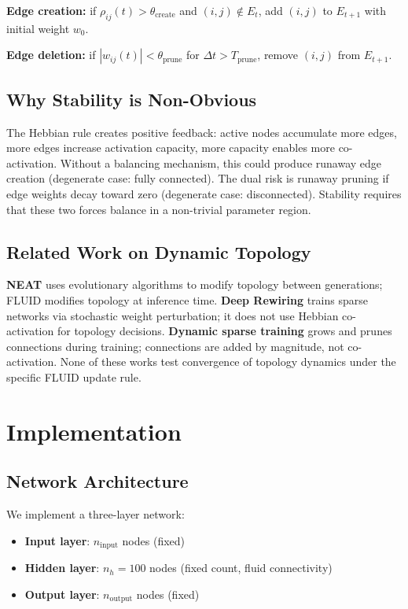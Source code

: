 \documentclass[12pt]{article}
\begin{document}
\textbf{Edge creation:} if $\rho_{ij}(t) > \theta_{\text{create}}$ and $(i,j) \notin E_t$, add $(i,j)$ to $E_{t+1}$ with initial weight $w_0$.

\textbf{Edge deletion:} if $|w_{ij}(t)| < \theta_{\text{prune}}$ for $\Delta t > T_{\text{prune}}$, remove $(i,j)$ from $E_{t+1}$.

\subsection{Why Stability is Non-Obvious}

The Hebbian rule creates positive feedback: active nodes accumulate more edges, more edges increase activation capacity, more capacity enables more co-activation. Without a balancing mechanism, this could produce runaway edge creation (degenerate case: fully connected). The dual risk is runaway pruning if edge weights decay toward zero (degenerate case: disconnected). Stability requires that these two forces balance in a non-trivial parameter region.

\subsection{Related Work on Dynamic Topology}

\textbf{NEAT} \cite{stanley2002} uses evolutionary algorithms to modify topology between generations; FLUID modifies topology at inference time. \textbf{Deep Rewiring} \cite{bellec2018} trains sparse networks via stochastic weight perturbation; it does not use Hebbian co-activation for topology decisions. \textbf{Dynamic sparse training} \cite{mocanu2018} grows and prunes connections during training; connections are added by magnitude, not co-activation. None of these works test convergence of topology dynamics under the specific FLUID update rule.

\section{Implementation}

\subsection{Network Architecture}

We implement a three-layer network:
\begin{itemize}
    \item \textbf{Input layer}: $n_{\text{input}}$ nodes (fixed)
    \item \textbf{Hidden layer}: $n_h = 100$ nodes (fixed count, fluid connectivity)
    \item \textbf{Output layer}: $n_{\text{output}}$ nodes (fixed)
\end{itemize}
\end{document}
